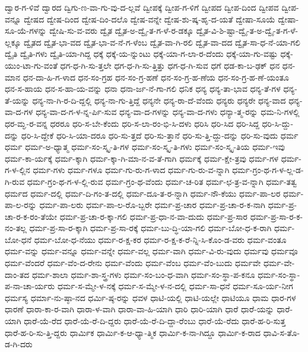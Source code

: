 {ದ್ವಾರ-ಗ-ಳಿವೆ
ದ್ವಾರದ
ದ್ವಿಗು-ಣ-ವಾ-ಗು-ವು-ದ-ಲ್ಲವೆ
ದ್ವೀಪಕ್ಕೆ
ದ್ವೀಪ-ಗ-ಳಿಗೆ
ದ್ವೀಪದ
ದ್ವೀಪ-ದಿಂದ
ದ್ವೀಪವ
ದ್ವೀಪ-ವನ್ನೂ
ದ್ವೇಷದ
ದ್ವೇಷ-ದಿಂದ
ದ್ವೇಷ-ದಿಂ-ದಲೊ
ದ್ವೇಷ-ವನ್ನೇ
ದ್ವೇಷ-ಶು-ಷ್ಕ-ಹೃ-ದ-ಯತೆ
ದ್ವೇಷಾ-ಸೂಯೆ
ದ್ವೇಷಾ-ಸೂ-ಯೆ-ಗಳನ್ನು
ದ್ವೇಷಿ-ಸು-ವ-ವರು
ದ್ವೈತ
ದ್ವೈತ-ಅ-ದ್ವೈ-ತ-ಗ-ಳೆ-ರ-ಡಕ್ಕೂ
ದ್ವೈತ-ವಿ-ಶಿ-ಷ್ಟಾ-ದ್ವೈ-ತ-ಅ-ದ್ವೈ-ತ-ಗ-ಳೆ-ಲ್ಲಕ್ಕೂ
ದ್ವೈತದ
ದ್ವೈತ-ಭಾ-ವದ
ದ್ವೈತ-ಭಾ-ವ-ನೆ-ಗ-ಳೆಂಬ
ದ್ವೈತ-ವಾ-ಗಿ-ರಲಿ
ದ್ವೈತ-ವಾ-ದದ
ದ್ವೈತ-ಸಾ-ಧ-ನೆ-ಯಾ-ಗಲಿ
ದ್ವೈತಿ
ದ್ವೈತಿ-ಗಳು
ದ್ವೈತಿ-ಯಾ-ಗಿದ್ದ
ಧಕ್ಕೆ
ಧಕ್ಕೆ-ಯ-ನ್ನುಂಟು
ಧಕ್ಕೆ-ಯಾ-ಗ-ಲಾ-ರ-ದೆಂದು
ಧಕ್ಕೆ-ಯಾ-ಗು-ವಷ್ಟು
ಧಕ್ಕೆ-ಯುಂ-ಟಾ-ಗು-ವಂತೆ
ಧಗ-ಧ-ಗಿ-ಸು-ತ್ತಲೇ
ಧಗ-ಧ-ಗಿ-ಸು-ತ್ತಿತ್ತು
ಧಗ-ಧ-ಗಿ-ಸುವ
ಧಗೆ
ಧಡ-ಕಾ-ಬ-ಢಕ್
ಧನ
ಧನ-ಮಾನ
ಧನ-ದಾ-ಹಿ-ಗ-ಳಾದ
ಧನ-ಸಂ-ಗ್ರಹ
ಧನ-ಸಂ-ಗ್ರ-ಹಣೆ
ಧನ-ಸಂ-ಗ್ರ-ಹ-ಣೆಯ
ಧನ-ಸಂ-ಗ್ರ-ಹ-ಣೆ-ಯಂತೂ
ಧನ-ಸ-ಹಾಯ
ಧನ-ಸ-ಹಾ-ಯ-ವನ್ನು
ಧನಾ
ಧನಾ-ರ್ಜ-ನೆ-ಗಾ-ಗಲಿ
ಧನಿಕ
ಧನ್ಯ
ಧನ್ಯ-ತಾ-ಭಾವ
ಧನ್ಯ-ತೆ-ಗಳ
ಧನ್ಯ-ತೆ-ಯನ್ನು
ಧನ್ಯ-ನಾ-ಗಿ-ರ-ದಿ-ದ್ದಲ್ಲಿ
ಧನ್ಯ-ನಾ-ಗು-ತ್ತಿದ್ದೆ
ಧನ್ಯನೇ
ಧನ್ಯ-ರಾ-ದೆ-ವೆಂದು
ಧನ್ಯರು
ಧನ್ಯರೇ
ಧನ್ಯ-ವಾದ
ಧನ್ಯ-ವಾ-ದ-ಗಳ
ಧನ್ಯ-ವಾ-ದ-ಗ-ಳ-ನ್ನ-ರ್ಪಿ-ಸುವ
ಧನ್ಯ-ವಾ-ದ-ಗಳನ್ನು
ಧನ್ಯ-ವಾ-ದ-ಗಳು
ಧನ್ಯಾ-ತ್ಮ-ರನ್ನು
ಧಮ-ನಿ-ಗಳಲ್ಲಿ
ಧರ-ಮ್ಘ-ರ-ವನ್ನ
ಧರರೂ
ಧರಿ-ಸ-ಬೇ-ಕೆಂದು
ಧರಿ-ಸ-ಲಾ-ರಂ-ಭಿ-ಸಿ-ದಳು
ಧರಿಸಿ
ಧರಿ-ಸಿದ
ಧರಿ-ಸಿದ್ದ
ಧರಿ-ಸಿ-ದ್ದು-ದನ್ನು
ಧರಿ-ಸಿ-ದ್ದೇಕೆ
ಧರಿ-ಸಿ-ಯಾ-ದರೂ
ಧರಿ-ಸು-ತ್ತದೆ
ಧರಿ-ಸು-ತ್ತಾನೆ
ಧರಿ-ಸು-ತ್ತಿ-ದ್ದು-ದನ್ನು
ಧರಿ-ಸು-ವುದು
ಧರ್ಮ
ಧರ್ಮ
ಧರ್ಮ-ಅ-ಧ್ಯಾತ್ಮ
ಧರ್ಮ-ಸಂ-ಸ್ಕೃ-ತಿ-ಗಳ
ಧರ್ಮ-ಸಂ-ಸ್ಕೃ-ತಿ-ಗಳು
ಧರ್ಮ-ಸಂ-ಸ್ಕೃ-ತಿಯ
ಧರ್ಮ-ಇವು
ಧರ್ಮ-ಕಾ-ರ್ಯಕ್ಕೆ
ಧರ್ಮ-ಕ್ಕಾಗಿ
ಧರ್ಮ-ಕ್ಕಾ-ಗಿ-ಮಾ-ನ-ವ-ತೆ-ಗಾಗಿ
ಧರ್ಮಕ್ಕೆ
ಧರ್ಮ-ಕ್ಷೇ-ತ್ರವು
ಧರ್ಮ-ಗಳ
ಧರ್ಮ-ಗ-ಳ-ಲ್ಲಿನ
ಧರ್ಮ-ಗಳು
ಧರ್ಮ-ಗಳೂ
ಧರ್ಮ-ಗು-ರು-ಗ-ಳಾದ
ಧರ್ಮ-ಗು-ರು-ವ-ನ್ನಾಗಿ
ಧರ್ಮ-ಗ್ರಂ-ಥ-ಗ-ಳ-ಲ್ಲ-ಡ-ಗಿ-ರುವ
ಧರ್ಮ-ಗ್ರಂ-ಥ-ಗ-ಳ-ಲ್ಲಿ-ರುವ
ಧರ್ಮ-ಗ್ರಂ-ಥ-ವೆಂದು
ಧರ್ಮ-ಚ-ರಿತ
ಧರ್ಮ-ಛ-ತ್ರ-ವ-ನ್ನಾಗಿ
ಧರ್ಮ-ತತ್ವ
ಧರ್ಮದ
ಧರ್ಮ-ದಲ್ಲಿ
ಧರ್ಮ-ದಿ-ಗಂ-ತ-ದಲ್ಲಿ
ಧರ್ಮ-ದೂ-ತ-ರ-ನ್ನಾಗಿ
ಧರ್ಮ-ನೌ-ಕೆಯು
ಧರ್ಮ-ಪಾ-ಲರ
ಧರ್ಮ-ಪಾ-ಲ-ರನ್ನು
ಧರ್ಮ-ಪಾ-ಲರು
ಧರ್ಮ-ಪಾ-ಲ-ರೊ-ಬ್ಬರೇ
ಧರ್ಮ-ಪ್ರ-ಚಾರ
ಧರ್ಮ-ಪ್ರ-ಚಾ-ರ-ಕ-ನಾಗಿ
ಧರ್ಮ-ಪ್ರ-ಚಾ-ರ-ಕ-ರಂ-ತೆಯೇ
ಧರ್ಮ-ಪ್ರ-ಚಾ-ರ-ಕ್ಕಾ-ಗಲಿ
ಧರ್ಮ-ಪ್ರ-ಧಾ-ನ-ವಾ-ದುದು
ಧರ್ಮ-ಪ್ರ-ಸಾರ
ಧರ್ಮ-ಪ್ರ-ಸಾ-ರ-ಕ-ನಂ-ತಲ್ಲ
ಧರ್ಮ-ಪ್ರ-ಸಾ-ರ-ಕ್ಕಾಗಿ
ಧರ್ಮ-ಪ್ರ-ಸಾ-ರಕ್ಕೆ
ಧರ್ಮ-ಬು-ದ್ಧಿ-ಯಾ-ಗಲಿ
ಧರ್ಮ-ಬೋ-ಧ-ಕ-ರಾಗಿ
ಧರ್ಮ-ಬೋ-ಧನೆ
ಧರ್ಮ-ಬೋ-ಧ-ನೆಯು
ಧರ್ಮ-ರ-ಕ್ಷ-ಕರ
ಧರ್ಮ-ರ-ಕ್ಷ-ಕ-ರೆ-ನ್ನಿ-ಸಿ-ಕೊಂ-ಡ-ವರು
ಧರ್ಮ-ವಂತೂ
ಧರ್ಮ-ವನ್ನು
ಧರ್ಮ-ವನ್ನೂ
ಧರ್ಮ-ವನ್ನೇ
ಧರ್ಮ-ವಲ್ಲ
ಧರ್ಮ-ವಾಗಿ
ಧರ್ಮ-ವಿ-ರು-ವುದು
ಧರ್ಮವು
ಧರ್ಮವೂ
ಧರ್ಮ-ವೆಂದರೆ
ಧರ್ಮ-ವೆಂ-ದ-ರೇನು
ಧರ್ಮ-ವೆಂದು
ಧರ್ಮ-ವೆಂಬ
ಧರ್ಮ-ವೆಂ-ಬುದು
ಧರ್ಮವೇ
ಧರ್ಮ-ವೇ-ದಾಂ-ತದ
ಧರ್ಮ-ಶಾಲಾ
ಧರ್ಮ-ಶಾ-ಸ್ತ್ರ-ಗಳು
ಧರ್ಮ-ಸಂ-ಬಂ-ಧ-ವಾಗಿ
ಧರ್ಮ-ಸಂ-ಸ್ಥಾ-ಪ-ಕನೂ
ಧರ್ಮ-ಸಂ-ಸ್ಥಾ-ಪ-ನಾ-ಚಾ-ರ್ಯರು
ಧರ್ಮ-ಸ-ಮ್ಮೇ-ಳ-ನಕ್ಕೆ
ಧರ್ಮ-ಸ-ಮ್ಮೇ-ಳ-ನ-ದಲ್ಲಿ
ಧರ್ಮ-ಸಾ-ಧನೆ
ಧರ್ಮ-ಸೂ-ರ್ಯ-ನೀಗ
ಧರ್ಮಸ್ಯ
ಧರ್ಮಾ-ನು-ಷ್ಠಾ-ನದ
ಧರ್ಮಿ-ಷ್ಠ-ರನ್ನು
ಧವಳ
ಧಾಟಿ-ಯಲ್ಲಿ
ಧಾಟಿ-ಯಲ್ಲೇ
ಧಾಟಿಯೂ
ಧಾಮ
ಧಾರ-ಗಳ
ಧಾರಣೆ
ಧಾರಾ-ಕಾ-ರ-ವಾಗಿ
ಧಾರಾ-ಳ-ವಾಗಿ
ಧಾರಾ-ವಾ-ಹಿ-ಯಾಗಿ
ಧಾರಿ
ಧಾರಿ-ಯಾಗಿ
ಧಾರೆ
ಧಾರೆ-ಯನ್ನು
ಧಾರೆ-ಯಾಗಿ
ಧಾರೆ-ಯೆ-ರೆದ
ಧಾರೆ-ಯೆ-ರೆ-ದಿ-ದ್ದರು
ಧಾರೆ-ಯೆ-ರೆ-ದಿ-ದ್ದಾ-ರೆಂಬು
ಧಾರೆ-ಯೆ-ರೆದು
ಧಾರೆ-ಹ-ರಿ-ಸುತ್ತ
ಧಾರೆ-ಹ-ರಿ-ಸು-ತ್ತಿ-ದ್ದರು
ಧಾರ್ಮಿಕ
ಧಾರ್ಮಿ-ಕ-ಆ-ಧ್ಯಾ-ತ್ಮಿಕ
ಧಾರ್ಮಿ-ಕ-ನಾ-ಗಿದ್ದೂ
ಧಾರ್ಮಿ-ಕ-ರಾದ
ಧಾವಿ-ಸ-ತೊ-ಡ-ಗಿ-ದರು
}
